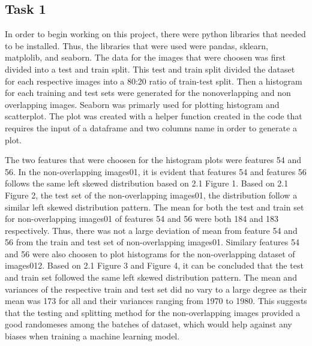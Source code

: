 \documentclass[12pt]{article}
\begin{document}
\begin{multicols*}{2}
  \section{Task 1}
  \hspace*{10mm} In order to begin working on this project, there were python libraries that needed to be installed. Thus, the libraries that were used were pandas, sklearn, matplolib,
  and seaborn. The data for the images that were choosen was first divided into a test and train split. This test and train split divided the dataset for each
  respective images into a 80:20 ratio of train-test split. Then a histogram for each training and test sets were generated for the nonoverlapping and non overlapping images.
  Seaborn was primarly used for plotting histogram and scatterplot. The plot was created with a helper function created in the code that requires the input of
  a dataframe and two columns name in order to generate a plot. 
  
  \hspace*{10mm} The two features that were choosen for the histogram plots were features 54 and 56. In the non-overlapping images01, it is
  evident that features 54 and features 56 follows the same left skewed distribution based on 2.1 Figure 1. Based on 2.1 Figure 2, the test set of the non-overlapping images01,
  the distribution follow a similar left skewed distribution pattern. The mean for both the test and train set for non-overlapping images01 of features 54 
  and 56 were both 184 and 183 respectively. Thus, there was not a large deviation of mean from feature 54 and 56 from the train and test set of non-overlapping
  images01. Similary features 54 and 56 were also choosen to plot histograms for the non-overlapping dataset of images012. Based on 2.1 Figure 3 and Figure 4, 
  it can be concluded that the test and train set followed the same left skewed distribution pattern. The mean and variances of the respective train and test
  set did no vary to a large degree as their mean was 173 for all and their variances ranging from 1970 to 1980. This suggests that the testing and splitting 
  method for the non-overlapping images provided a good randomeses among the batches of dataset, which would help against any biases when training a machine learning
  model.


\end{multicols*}
\end{document}
